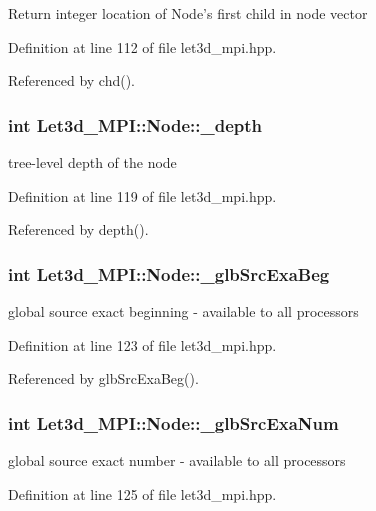 Return integer location of Node's first child in node vector 

Definition at line 112 of file let3d\_\-mpi.hpp.

Referenced by chd().
\subsubsection{\setlength{\rightskip}{0pt plus 5cm}int {\bf Let3d\_\-MPI::Node::\_\-depth}\hspace{0.3cm}{\tt  [protected]}}\label{classLet3d__MPI_1_1Node_1a4b494c7ddb30acebee8498451bd389_1a4b494c7ddb30acebee8498451bd389}


tree-level depth of the node 

Definition at line 119 of file let3d\_\-mpi.hpp.

Referenced by depth().
\subsubsection{\setlength{\rightskip}{0pt plus 5cm}int {\bf Let3d\_\-MPI::Node::\_\-glb\-Src\-Exa\-Beg}\hspace{0.3cm}{\tt  [protected]}}\label{classLet3d__MPI_1_1Node_2eb6f0049fd9c23391ec5e8c7a87cf25_2eb6f0049fd9c23391ec5e8c7a87cf25}


global source exact beginning - available to all processors 

Definition at line 123 of file let3d\_\-mpi.hpp.

Referenced by glb\-Src\-Exa\-Beg().
\subsubsection{\setlength{\rightskip}{0pt plus 5cm}int {\bf Let3d\_\-MPI::Node::\_\-glb\-Src\-Exa\-Num}\hspace{0.3cm}{\tt  [protected]}}\label{classLet3d__MPI_1_1Node_d2f9b604fcdf7d1f83fc4cfe38aa62e1_d2f9b604fcdf7d1f83fc4cfe38aa62e1}


global source exact number - available to all processors 

Definition at line 125 of file let3d\_\-mpi.hpp.

